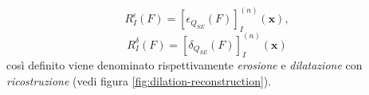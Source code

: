 \begin{equation}
	\label{eq:erosion-reconstruction}
	R^{\epsilon}_{I}(F)=[\epsilon_{Q_{SE}}(F)]^{(n)}_{I}(\textbf{x}),
\end{equation}
\begin{equation}
	\label{eq:dilation-reconstruction}
	R^{\delta}_{I}(F)=[\delta_{Q_{SE}}(F)]^{(n)}_{I}(\textbf{x})
\end{equation}
cos\`i definito viene denominato rispettivamente \textit{erosione} e \textit{dilatazione} con \textit{ricostruzione} (vedi figura \ref{fig:dilation-reconstruction}).\par
\begin{figure}[H]
	\centering
\end{figure}
